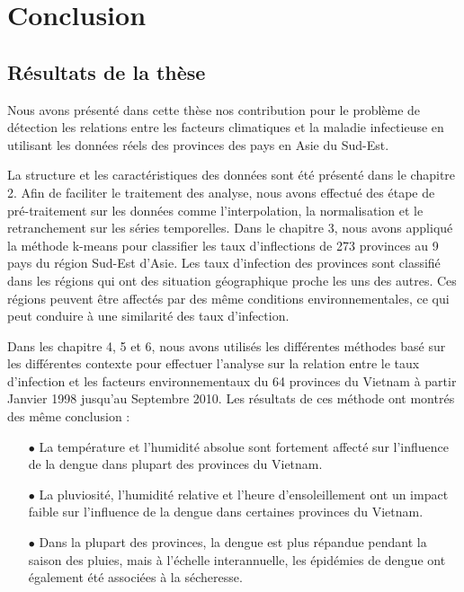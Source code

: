 
\chapter{Conclusion}
\label{conclusion}

\section{Résultats de la thèse}
Nous avons présenté dans cette thèse nos contribution pour le problème de détection les relations entre les facteurs climatiques et la maladie infectieuse en utilisant les données réels des provinces des pays en Asie du Sud-Est. 

La structure et les caractéristiques des données sont été présenté dans le chapitre 2. Afin de faciliter le traitement des analyse, nous avons effectué des étape de pré-traitement sur les données comme l'interpolation, la normalisation et le retranchement sur les séries temporelles. Dans le chapitre 3, nous avons appliqué la méthode k-means pour classifier les taux d'inflections de 273 provinces au 9 pays du région Sud-Est d'Asie. Les taux d'infection des provinces sont classifié dans les régions qui ont des situation géographique proche les uns des autres.  Ces régions peuvent être affectés par des même conditions environnementales, ce qui peut conduire à une similarité des taux d'infection.  

Dans les chapitre 4, 5 et 6, nous avons utilisés les différentes méthodes basé sur les différentes contexte pour effectuer l'analyse sur la relation entre le taux d'infection et les facteurs environnementaux du 64 provinces du Vietnam à partir Janvier 1998 jusqu'au Septembre 2010. Les résultats de ces méthode ont montrés des même conclusion :
\begin{itemize}
\item[$\bullet$] La température et l'humidité absolue sont fortement affecté sur l'influence de la dengue dans plupart des provinces du Vietnam.
\item[$\bullet$] La pluviosité, l'humidité relative et l'heure d'ensoleillement ont un impact faible sur l'influence de la dengue dans certaines provinces du Vietnam.
\item[$\bullet$] Dans la plupart des provinces, la dengue est plus répandue pendant la saison des pluies, mais à l'échelle interannuelle, les épidémies de dengue ont également été associées à la sécheresse. 
\end{itemize}

